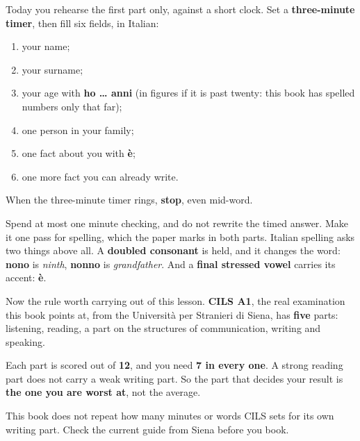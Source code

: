 Today you rehearse the first part only, against a short clock. Set a \textbf{three-minute timer}, then fill six fields, in Italian:

\begin{enumerate}
\raggedright
  \item your name;
  \item your surname;
  \item your age with \textbf{ho … anni} (in figures if it is past twenty: this book has spelled numbers only that far);
  \item one person in your family;
  \item one fact about you with \textbf{è};
  \item one more fact you can already write.
\end{enumerate}

When the three-minute timer rings, \textbf{stop}, even mid-word.

\begin{tcolorbox}[breakable,colback=teal!4,colframe=teal!35!black,title={Before you move on}]
Spend at most one minute checking, and do not rewrite the timed answer. Make it one pass for spelling, which the paper marks in both parts. Italian spelling asks two things above all. A \textbf{doubled consonant} is held, and it changes the word: \textbf{nono} is \emph{ninth}, \textbf{nonno} is \emph{grandfather}. And a \textbf{final stressed vowel} carries its accent: \textbf{è}.

Now the rule worth carrying out of this lesson. \textbf{CILS A1}, the real examination this book points at, from the Università per Stranieri di Siena, has \textbf{five} parts: listening, reading, a part on the structures of communication, writing and speaking.

Each part is scored out of \textbf{12}, and you need \textbf{7 in every one}. A strong reading part does not carry a weak writing part. So the part that decides your result is \textbf{the one you are worst at}, not the average.

This book does not repeat how many minutes or words CILS sets for its own writing part. Check the current guide from Siena before you book.
\end{tcolorbox}
